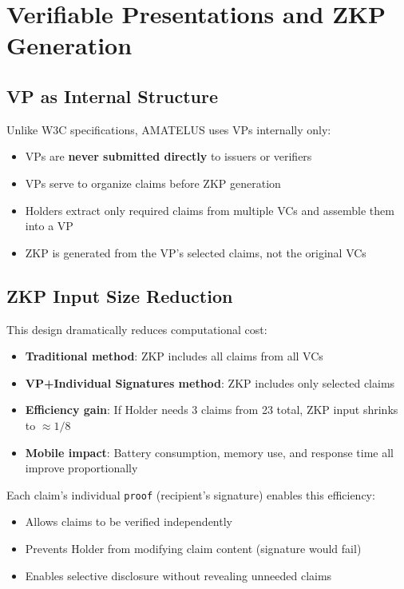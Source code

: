 \section{Verifiable Presentations and ZKP Generation}

\subsection{VP as Internal Structure}

Unlike W3C specifications, AMATELUS uses VPs internally only:

\begin{itemize}
  \item VPs are \textbf{never submitted directly} to issuers or verifiers
  \item VPs serve to organize claims before ZKP generation
  \item Holders extract only required claims from multiple VCs and assemble them into a VP
  \item ZKP is generated from the VP's selected claims, not the original VCs
\end{itemize}

\subsection{ZKP Input Size Reduction}

This design dramatically reduces computational cost:

\begin{itemize}
  \item \textbf{Traditional method}: ZKP includes all claims from all VCs
  \item \textbf{VP+Individual Signatures method}: ZKP includes only selected claims
  \item \textbf{Efficiency gain}: If Holder needs 3 claims from 23 total, ZKP input shrinks to $\approx 1/8$
  \item \textbf{Mobile impact}: Battery consumption, memory use, and response time all improve proportionally
\end{itemize}

Each claim's individual \texttt{proof} (recipient's signature) enables this efficiency:

\begin{itemize}
  \item Allows claims to be verified independently
  \item Prevents Holder from modifying claim content (signature would fail)
  \item Enables selective disclosure without revealing unneeded claims
\end{itemize}

